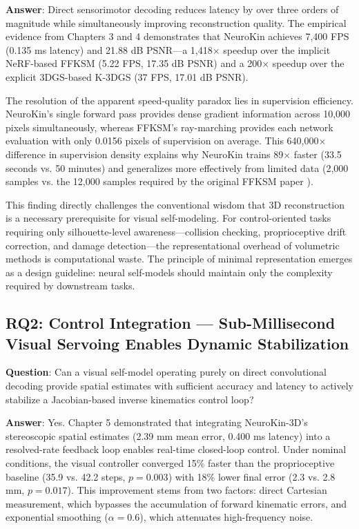 \documentclass[12pt,a4paper,oneside]{report}
\begin{document}
\textbf{Answer}: Direct sensorimotor decoding reduces latency by over three orders of magnitude while simultaneously improving reconstruction quality. The empirical evidence from Chapters 3 and 4 demonstrates that NeuroKin achieves 7,400 FPS (0.135 ms latency) and 21.88 dB PSNR—a 1,418× speedup over the implicit NeRF-based FFKSM (5.22 FPS, 17.35 dB PSNR) and a 200× speedup over the explicit 3DGS-based K-3DGS (37 FPS, 17.01 dB PSNR).

The resolution of the apparent speed-quality paradox lies in supervision efficiency. NeuroKin's single forward pass provides dense gradient information across 10,000 pixels simultaneously, whereas FFKSM's ray-marching provides each network evaluation with only 0.0156 pixels of supervision on average. This 640,000× difference in supervision density explains why NeuroKin trains 89× faster (33.5 seconds vs. 50 minutes) and generalizes more effectively from limited data (2,000 samples vs. the 12,000 samples required by the original FFKSM paper \cite{hu2024teaching}).

This finding directly challenges the conventional wisdom that 3D reconstruction is a necessary prerequisite for visual self-modeling. For control-oriented tasks requiring only silhouette-level awareness—collision checking, proprioceptive drift correction, and damage detection—the representational overhead of volumetric methods is computational waste. The principle of minimal representation emerges as a design guideline: neural self-models should maintain only the complexity required by downstream tasks.

\subsection{RQ2: Control Integration — Sub-Millisecond Visual Servoing Enables Dynamic Stabilization}

\textbf{Question}: Can a visual self-model operating purely on direct convolutional decoding provide spatial estimates with sufficient accuracy and latency to actively stabilize a Jacobian-based inverse kinematics control loop?

\textbf{Answer}: Yes. Chapter 5 demonstrated that integrating NeuroKin-3D's stereoscopic spatial estimates (2.39 mm mean error, 0.400 ms latency) into a resolved-rate feedback loop enables real-time closed-loop control. Under nominal conditions, the visual controller converged 15\% faster than the proprioceptive baseline (35.9 vs. 42.2 steps, $p = 0.003$) with 18\% lower final error (2.3 vs. 2.8 mm, $p = 0.017$). This improvement stems from two factors: direct Cartesian measurement, which bypasses the accumulation of forward kinematic errors, and exponential smoothing ($\alpha = 0.6$), which attenuates high-frequency noise.
\end{document}
